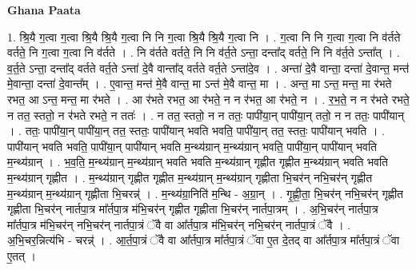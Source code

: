 \documentclass[17pt]{extarticle}
\begin{document}
\textbf{Ghana Paata } \newline

1. श्रि॒यै ग॒त्वा ग॒त्वा श्रि॒यै श्रि॒यै ग॒त्वा नि नि ग॒त्वा श्रि॒यै श्रि॒यै ग॒त्वा नि । . ग॒त्वा नि नि ग॒त्वा ग॒त्वा नि व॑र्तते वर्तते॒ नि ग॒त्वा ग॒त्वा नि व॑र्तते । . नि व॑र्तते वर्तते॒ नि नि व॑र्त॒ते ऽन्ता॒ दन्ता᳚द् वर्तते॒ नि नि व॑र्त॒ते ऽन्ता᳚त् । . व॒र्त॒ते ऽन्ता॒ दन्ता᳚द् वर्तते वर्त॒ते ऽन्ता॑ दे॒वै वान्ता᳚द् वर्तते वर्त॒ते ऽन्ता॑दे॒व । . अन्ता॑ दे॒वै वान्ता॒ दन्ता॑ दे॒वान्त॒ मन्त॑ मे॒वान्ता॒ दन्ता॑ दे॒वान्त᳚म् । . ए॒वान्त॒ मन्त॑ मे॒वै वान्त॒ मा ऽन्त॑ मे॒वै वान्त॒ मा । . अन्त॒ मा ऽन्त॒ मन्त॒ मा र॑भते रभत॒ आ ऽन्त॒ मन्त॒ मा र॑भते । . आ र॑भते रभत॒ आ र॑भते॒ न न र॑भत॒ आ र॑भते॒ न । . र॒भ॒ते॒ न न र॑भते रभते॒ न तत॒ स्ततो॒ न र॑भते रभते॒ न ततः॑ । . न तत॒ स्ततो॒ न न ततः॒ पापी॑या॒न् पापी॑या॒न् ततो॒ न न ततः॒ पापी॑यान् । . ततः॒ पापी॑या॒न् पापी॑या॒न् तत॒ स्ततः॒ पापी॑यान् भवति भवति॒ पापी॑या॒न् तत॒ स्ततः॒ पापी॑यान् भवति । . पापी॑यान् भवति भवति॒ पापी॑या॒न् पापी॑यान् भवति म॒न्थ्य॑ग्रान् म॒न्थ्य॑ग्रान् भवति॒ पापी॑या॒न् पापी॑यान् भवति म॒न्थ्य॑ग्रान् । . भ॒व॒ति॒ म॒न्थ्य॑ग्रान् म॒न्थ्य॑ग्रान् भवति भवति म॒न्थ्य॑ग्रान् गृह्णीत गृह्णीत म॒न्थ्य॑ग्रान् भवति भवति म॒न्थ्य॑ग्रान् गृह्णीत । . म॒न्थ्य॑ग्रान् गृह्णीत गृह्णीत म॒न्थ्य॑ग्रान् म॒न्थ्य॑ग्रान् गृह्णीता भि॒चर॑न् नभि॒चर॑न् गृह्णीत म॒न्थ्य॑ग्रान् म॒न्थ्य॑ग्रान् गृह्णीता भि॒चरन्न्॑ । . म॒न्थ्य॑ग्रा॒निति॑ म॒न्थि - अ॒ग्रा॒न् । . गृ॒ह्णी॒ता॒ भि॒चर॑न् नभि॒चर॑न् गृह्णीत गृह्णीता भि॒चर॑न् नार्तपा॒त्र मा᳚र्तपा॒त्र म॑भि॒चर॑न् गृह्णीत गृह्णीता भि॒चर॑न् नार्तपा॒त्रम् । . अ॒भि॒चर॑न् नार्तपा॒त्र मा᳚र्तपा॒त्र म॑भि॒चर॑न् नभि॒चर॑न् नार्तपा॒त्रं ॅवै वा आ᳚र्तपा॒त्र म॑भि॒चर॑न् नभि॒चर॑न् नार्तपा॒त्रं ॅवै । . अ॒भि॒चर॒न्नित्य॑भि - चरन्न्॑ । . आ॒र्त॒पा॒त्रं ॅवै वा आ᳚र्तपा॒त्र मा᳚र्तपा॒त्रं ॅवा ए॒त दे॒तद् वा आ᳚र्तपा॒त्र मा᳚र्तपा॒त्रं ॅवा ए॒तत् । \newline
\end{document}
